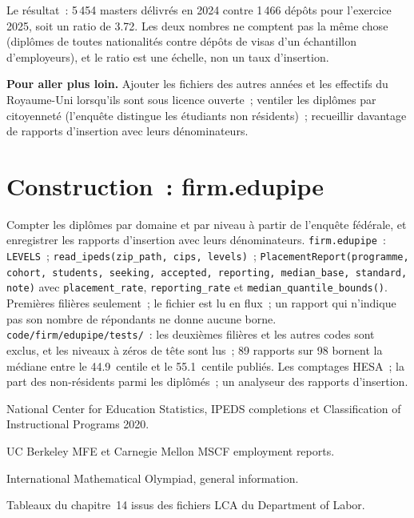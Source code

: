Le résultat~: 5\,454 masters délivrés en 2024 contre 1\,466 dépôts pour l'exercice 2025, soit un ratio de 3.72. Les deux nombres
ne comptent pas la même chose (diplômes de toutes nationalités contre dépôts de visas d'un échantillon d'employeurs), et le ratio est une
échelle, non un taux d'insertion.

\textbf{Pour aller plus loin.} Ajouter les fichiers des autres années et les effectifs du Royaume-Uni lorsqu'ils sont sous licence ouverte~; ventiler les diplômes
par citoyenneté (l'enquête distingue les étudiants non résidents)~; recueillir davantage de rapports d'insertion avec leurs dénominateurs.

\section{Construction~: firm.edupipe}\label{bld:in:education-pipelines:edupipe}

\begin{build}
 Compter les diplômes par domaine et par niveau à partir de l'enquête fédérale, et enregistrer les rapports d'insertion avec
leurs dénominateurs.
 \texttt{firm.edupipe}~: \texttt{LEVELS}~; \texttt{read\_ipeds(zip\_path, cips, levels)}~;
\texttt{PlacementReport(programme, cohort, students, seeking, accepted, reporting, median\_base, standard, note)} avec
\texttt{placement\_rate}, \texttt{reporting\_rate} et \texttt{median\_quantile\_bounds()}.
 Premières filières seulement~; le fichier est lu en flux~; un rapport qui n'indique pas son nombre de répondants ne donne aucune borne.
 \texttt{code/firm/edupipe/tests/}~: les deuxièmes filières et les autres codes sont exclus, et les niveaux à zéros de tête
sont lus~; 89 rapports sur 98 bornent la médiane entre le 44.9~centile et le 55.1~centile publiés.
 Les comptages HESA~; la part des non-résidents parmi les diplômés~; un analyseur des rapports d'insertion.
\end{build}

\begin{omsources}
\item National Center for Education Statistics, IPEDS completions et Classification of Instructional Programs 2020.
\item UC Berkeley MFE et Carnegie Mellon MSCF employment reports.
\item International Mathematical Olympiad, general information.
\item Tableaux du chapitre~14 issus des fichiers LCA du Department of Labor.
\end{omsources}

